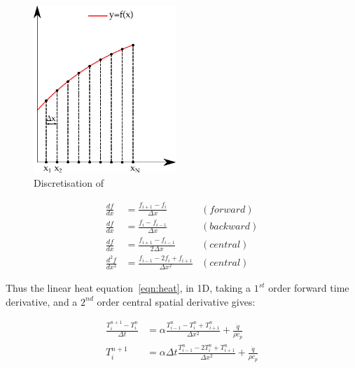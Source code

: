 \begin{figure}
  \begin{center}
    \includegraphics[width=0.48\textwidth]{./ablation/images/fdm.pdf}
  \end{center}
  \caption{Discretisation of }\label{fig:fdmexplain}

\end{figure}

\begin{subequations}
\begin{align}
\frac{df}{dx} &= \frac{f_{i+1} - f_{i}}{\Delta x}  &(forward) \label{eqn:fdmfwd}\\
\frac{df}{dx} &= \frac{f_{i} - f_{i-1}}{\Delta x}  &(backward) \label{eqn:fdmbck}\\
\frac{df}{dx} &= \frac{f_{i+1} - f_{i-1}}{2\Delta x}  &(central)\label{eqn:fdmcent}\\
\frac{d^2f}{dx^2} &= \frac{f_{i-1}-2f_i+f_{i+1}}{\Delta x^2} &(central)\label{eqn:fdmcent2}
\end{align}
\end{subequations}


Thus the linear heat equation~\cref{eqn:heat}, in 1D, taking a $1^{st}$ order forward time derivative, and a $2^{nd}$ order central spatial derivative gives:

\begin{subequations}
\begin{align}
\frac{T^{n+1}_i-T^{n}_i}{\Delta t} &= \alpha\frac{T^n_{i-1}-T^n_{i}+T^n_{i+1}}{\Delta x^2}  + \frac{\dot{q}}{\rho c_p}\\
T_{i}^{n+1} &=  \alpha\Delta t \frac{T_{i-1}^n-2T_i^n+T_{i+1}^n}{\Delta x^2} + \frac{\dot{q}}{\rho c_p}
\label{eqn:simplefdm}
\end{align}
\end{subequations}

